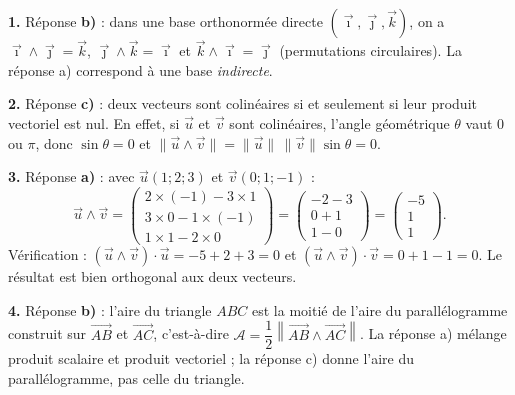 \documentclass[11pt]{article}
\begin{document}
\begin{corrige}
\textbf{1.} Réponse \textbf{b)} : dans une base orthonormée directe $(\vec{\imath}, \vec{\jmath}, \vec{k})$, on a $\vec{\imath} \wedge \vec{\jmath} = \vec{k}$, $\vec{\jmath} \wedge \vec{k} = \vec{\imath}$ et $\vec{k} \wedge \vec{\imath} = \vec{\jmath}$ (permutations circulaires). La réponse a) correspond à une base \emph{indirecte}.

\textbf{2.} Réponse \textbf{c)} : deux vecteurs sont colinéaires si et seulement si leur produit vectoriel est nul. En effet, si $\vec{u}$ et $\vec{v}$ sont colinéaires, l'angle géométrique $\theta$ vaut $0$ ou $\pi$, donc $\sin\theta = 0$ et $\|\vec{u} \wedge \vec{v}\| = \|\vec{u}\|\,\|\vec{v}\|\sin\theta = 0$.

\textbf{3.} Réponse \textbf{a)} : avec $\vec{u}(1;2;3)$ et $\vec{v}(0;1;-1)$ :
\[ \vec{u} \wedge \vec{v} = \begin{pmatrix} 2\times(-1) - 3\times 1 \\ 3\times 0 - 1\times(-1) \\ 1\times 1 - 2\times 0 \end{pmatrix} = \begin{pmatrix} -2-3 \\ 0+1 \\ 1-0 \end{pmatrix} = \begin{pmatrix} -5 \\ 1 \\ 1 \end{pmatrix}. \]
Vérification : $(\vec{u}\wedge\vec{v})\cdot\vec{u} = -5+2+3 = 0$ et $(\vec{u}\wedge\vec{v})\cdot\vec{v} = 0+1-1 = 0$. Le résultat est bien orthogonal aux deux vecteurs.

\textbf{4.} Réponse \textbf{b)} : l'aire du triangle $ABC$ est la moitié de l'aire du parallélogramme construit sur $\overrightarrow{AB}$ et $\overrightarrow{AC}$, c'est-à-dire $\mathcal{A} = \dfrac{1}{2}\left\|\overrightarrow{AB} \wedge \overrightarrow{AC}\right\|$. La réponse a) mélange produit scalaire et produit vectoriel ; la réponse c) donne l'aire du parallélogramme, pas celle du triangle.
\end{corrige}
\end{document}
